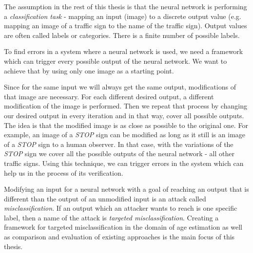 The assumption in the rest of this thesis is that the neural network is performing a \textit{classification task} - mapping an input (image) to a discrete output value (e.g. mapping an image of a traffic sign to the name of the traffic sign).  Output values are often called labels or categories. There is a finite number of possible labels.

To find errors in a system where a neural network is used, we need a framework which can trigger every possible output of the neural network.  We want to achieve that by using only one image as a starting point. 

Since for the same input we will always get the same output, modifications of that image are necessary. For each different desired output, a different modification of the image is performed.
Then we repeat that process by changing our desired output in every iteration and in that way, cover all possible outputs. The idea is that the modified image is as close as possible to the original one. For example, an image of a  \textit{STOP} sign can be modified as long as it still is an image of a  \textit{STOP} sign to a human observer. In that case, with the variations of the \textit{STOP} sign we cover all the possible outputs of the neural network - all other traffic signs. Using this technique, we can trigger errors in the system which can help us in the process of its verification. 

Modifying an input for a neural network with a goal of reaching an output that is different than the output of an unmodified input is an attack called \textit{misclassification}. If an output which an attacker wants to reach is one specific label, then a name of the attack is \textit{targeted misclassification}. Creating a framework for targeted misclassification in the domain of age estimation as well as comparison and evaluation of existing approaches is the main focus of this thesis.